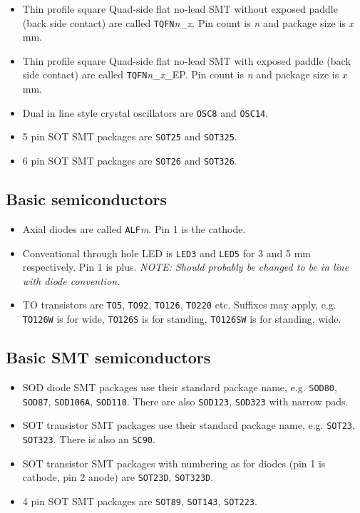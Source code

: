 \documentclass{article}
\begin{document}
\begin{itemize}
\item   Thin profile square Quad-side flat no-lead SMT without exposed
	paddle (back side contact) are called
        {\tt TQFN}{\it n}\_{\it x}.  Pin count is {\it n} and
	package size is {\it x} mm.

\item   Thin profile square Quad-side flat no-lead SMT with exposed
	paddle (back side contact) are called
        {\tt TQFN}{\it n}\_{\it x}\_EP.  Pin count is {\it n} and
	package size is {\it x} mm.

\item   Dual in line style crystal oscillators are {\tt OSC8} and
	{\tt OSC14}.

\item   5 pin SOT SMT packages are {\tt SOT25} and {\tt SOT325}.

\item   6 pin SOT SMT packages are {\tt SOT26} and {\tt SOT326}.
\end{itemize}

\subsection{Basic semiconductors}
\begin{itemize}
\item   Axial diodes are called {\tt ALF}{\it m}. Pin 1 is the cathode.

\item   Conventional through hole LED is {\tt LED3} and {\tt LED5}
	for 3 and 5 mm respectively. Pin 1 is plus. 
	{\it NOTE: Should probably be changed to be in line with diode
	convention.}

\item   TO transistors are {\tt TO5}, {\tt TO92}, {\tt TO126}, 
	{\tt TO220} etc. Suffixes may apply, e.g. {\tt TO126W} is for 
	wide, {\tt TO126S} is for standing, {\tt TO126SW} is for standing,
	wide.
\end{itemize}

\subsection{Basic SMT semiconductors}
\begin{itemize}
\item   SOD diode SMT packages use their standard package name, e.g.
	{\tt SOD80}, {\tt SOD87}, {\tt SOD106A}, {\tt SOD110}. There are 
	also {\tt SOD123}, {\tt SOD323} with narrow pads.

\item   SOT transistor SMT packages use their standard package name,
	e.g. {\tt SOT23}, {\tt SOT323}. There is also an {\tt SC90}.

\item   SOT transistor SMT packages with numbering as for diodes (pin 1
	is cathode, pin 2 anode) are {\tt SOT23D}, {\tt SOT323D}.

\item   4 pin SOT SMT packages are {\tt SOT89}, {\tt SOT143}, {\tt SOT223}.
\end{itemize}
\end{document}
